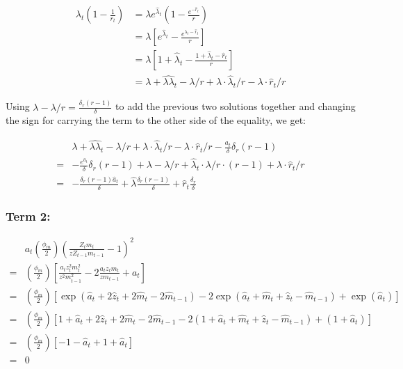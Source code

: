 \documentclass[11pt,preprint, authoryear]{elsarticle}
\numberwithin{equation}{section}
\numberwithin{figure}{section}
\numberwithin{table}{section}
\begin{document}
\[\begin{aligned} \lambda_{t}\left(1-\frac{1}{r_{t}}\right) 
&=\lambda e^{\hat{\lambda}_{t}}\left(1-\frac{e^{-\hat{r}_{t}}}{r}\right)\\
&=\lambda\left[e^{\hat{\lambda}_{t}}-\frac{e^{\lambda_{t}-\hat{r}_{t}}}{r}\right]\\
&=\lambda\left[1+\hat{\lambda}_{t}-\frac{1+\hat{\lambda}_{t}-\hat{r}_{t}}{r}\right]\\
&=\lambda+\hat{\lambda \lambda}_{t} - \lambda/r + \lambda \cdot \hat{\lambda}_{t}/r - \lambda \cdot \hat{r}_{t}/r \end{aligned}\]

Using \(\lambda - \lambda/r = \frac{\delta_r(r-1)}{\delta}\) to add the
previous two solutions together and changing the sign for carrying the
term to the other side of the equality, we get:

\[\begin{aligned}&\lambda+\hat{\lambda \lambda}_{t} - \lambda/r + \lambda \cdot \hat{\lambda}_{t}/r - \lambda \cdot \hat{r}_{t}/r -\frac{a_{t}}{\delta}\delta_{r}(r-1)\\
= &-\frac{e^{\hat{a}_{t}}}{\delta}\delta_{r}(r-1) + \lambda-\lambda/r+\hat{\lambda}_t \cdot \lambda/r \cdot (r-1) + \lambda \cdot \hat{r}_t/r\\
=& -\frac{\delta_r(r-1) \hat{a}_t}{\delta} + \hat{\lambda}\frac{\delta_r (r-1)}{\delta} +\hat{r}_t \frac{\delta_r}{\delta}
\end{aligned}\]

\hypertarget{term-2-1}{%
\subsubsection{Term 2:}\label{term-2-1}}

\[\begin{aligned}&a_{t}\left(\frac{\phi_{m}}{2}\right)\left(\frac{Z_t m_t }{z Z_{t-1}m_{t-1}}-1\right)^{2}\\
=& \left(\frac{\phi_{m}}{2}\right) \left[ \frac{a_{t} z_{t}^{2} m_{t}^{2}}{z^{2} m_{t-1}^{2}} - 2 \frac{a_{t} z_{t} m_{t}}{z m_{t-1}} + a_{t} \right]\\
=& \left(\frac{\phi_{m}}{2}\right) \left[ \exp(\hat{a}_{t}+2 \hat{z}_{t}+2 \hat{m}_{t}-2 \hat{m}_{t-1})-2 \exp(\hat{a}_{t}+\hat{m}_{t}+\hat{z}_{t}-\hat{m}_{t-1})+ \exp(\hat{a}_{t}) \right] \\
=& \left(\frac{\phi_{m}}{2}\right) \left[ 1 + \hat{a}_{t}+2 \hat{z}_{t}+2 \hat{m}_{t}-2 \hat{m}_{t-1} - 2( 1 + \hat{a}_{t}+\hat{m}_{t}+\hat{z}_{t}-\hat{m}_{t-1}) + (1 + \hat{a}_{t}) \right] \\
=& \left(\frac{\phi_{m}}{2}\right) \left[ -1 - \hat{a}_t + 1 + \hat{a}_t \right]\\
=& 0
\end{aligned}\]
\end{document}
